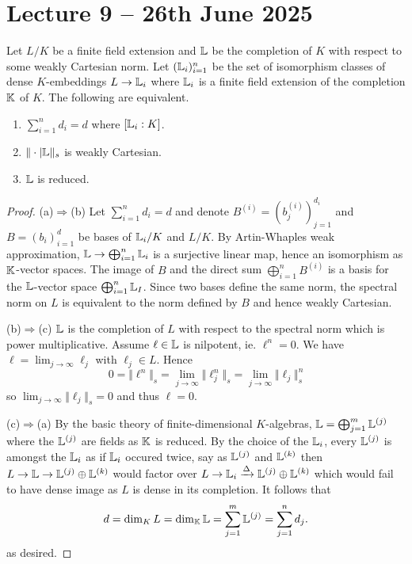 \section{Lecture 9 -- 26th June 2025}\label{sec: lecture 9}
\begin{proposition}\label{prop: equivalent conditions on dense embeddings}
    Let $L/K$ be a finite field extension and $\mathbb{L}$ be the completion of $K$ with respect to some weakly Cartesian norm. Let $(\mathbb{L}_{i})_{i=1}^{n}$ be the set of isomorphism classes of dense $K$-embeddings $L\to\mathbb{L}_{i}$ where $\mathbb{L}_{i}$ is a finite field extension of the completion $\mathbb{K}$ of $K$. The following are equivalent. 
    \begin{enumerate}[label=(\alph*)]
        \item $\sum_{i=1}^{n}d_{i}=d$ where $[\mathbb{L}_{i}:K]$. 
        \item $\Vert\cdot|\mathbb{L}\Vert_{s}$ is weakly Cartesian. 
        \item $\mathbb{L}$ is reduced. 
    \end{enumerate}
\end{proposition}
\begin{proof}
    (a)$\Rightarrow$(b) Let $\sum_{i=1}^{n}d_{i}=d$ and denote $B^{(i)}=(b_{j}^{(i)})_{j=1}^{d_{i}}$ and $B=(b_{i})_{i=1}^{d}$ be bases of $\mathbb{L}_{i}/K$ and $L/K$. By Artin-Whaples weak approximation, $\mathbb{L}\to\bigoplus_{i=1}^{n}\mathbb{L}_{i}$ is a surjective linear map, hence an isomorphism as $\mathbb{K}$-vector spaces. The image of $B$ and the direct sum $\bigoplus_{i=1}^{n}B^{(i)}$ is a basis for the $\mathbb{L}$-vector space $\bigoplus_{i=1}^{n}\mathbb{L}_{I}$. Since two bases define the same norm, the spectral norm on $L$ is equivalent to the norm defined by $B$ and hence weakly Cartesian. 

    (b)$\Rightarrow$(c) $\mathbb{L}$ is the completion of $L$ with respect to the spectral norm which is power multiplicative. Assume $\ell\in\mathbb{L}$ is nilpotent, ie. $\ell^{n}=0$. We have $\ell=\lim_{j\to\infty}\ell_{j}$ with $\ell_{j}\in L$. Hence 
    $$0=\Vert\ell^{n}\Vert_{s}=\lim_{j\to\infty}\Vert \ell_{j}^{n}\Vert_{s} =\lim_{j\to\infty}\Vert\ell_{j}\Vert_{s}^{n}$$
    so $\lim_{j\to\infty}\Vert\ell_{j}\Vert_{s}=0$ and thus $\ell=0$. 

    (c)$\Rightarrow$(a) By the basic theory of finite-dimensional $K$-algebras, $\mathbb{L}=\bigoplus_{j=1}^{m}\mathbb{L}^{(j)}$ where the $\mathbb{L}^{(j)}$ are fields as $\mathbb{K}$ is reduced. By the choice of the $\mathbb{L}_{i}$, every $\mathbb{L}^{(j)}$ is amongst the $\mathbb{L}_{i}$ as if $\mathbb{L}_{i}$ occured twice, say as $\mathbb{L}^{(j)}$ and $\mathbb{L}^{(k)}$ then $L\to\mathbb{L}\to\mathbb{L}^{(j)}\oplus\mathbb{L}^{(k)}$ would factor over $L\to\mathbb{L}_{i}\xrightarrow{\Delta}\mathbb{L}^{(j)}\oplus\mathbb{L}^{(k)}$ which would fail to have dense image as $L$ is dense in its completion. It follows that 
    $$d=\dim_{K}L=\dim_{\mathbb{K}}\mathbb{L}=\sum_{j=1}^{m}\mathbb{L}^{(j)}=\sum_{j=1}^{n}d_{j}.$$
    as desired. 
\end{proof}
